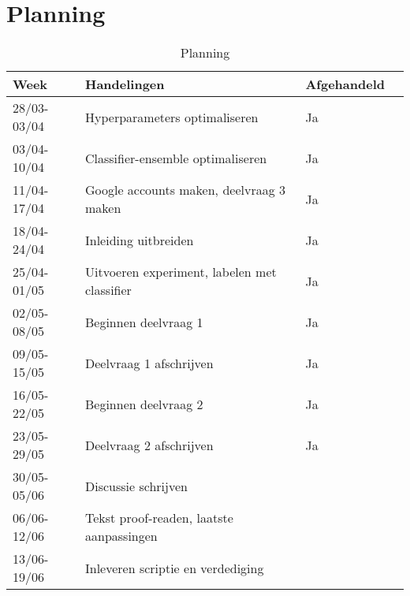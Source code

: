 \documentclass[../main.tex]{subfiles}
\begin{document}
\section{Planning}

\begin{table}[!b]
\centering
\caption{Planning}
\label{tab:planning}
\begin{tabular}{@{}ll@{}ll@{}}
\toprule
Week        & Handelingen                                                     & Afgehandeld \\ \midrule
28/03-03/04 & Hyperparameters optimaliseren                                   &     Ja      \\
03/04-10/04 & Classifier-ensemble optimaliseren                               &     Ja      \\
11/04-17/04 & Google accounts maken, deelvraag 3 maken                        &     Ja      \\
18/04-24/04 & Inleiding uitbreiden                                            &     Ja      \\
25/04-01/05 & Uitvoeren experiment, labelen met classifier                    &     Ja      \\
02/05-08/05 & Beginnen deelvraag 1                                            &     Ja      \\
09/05-15/05 & Deelvraag 1 afschrijven                                         &     Ja      \\
16/05-22/05 & Beginnen deelvraag 2                                            &     Ja      \\
23/05-29/05 & Deelvraag 2 afschrijven                                         &     Ja      \\
30/05-05/06 & Discussie schrijven                                             &             \\
06/06-12/06 & Tekst proof-readen, laatste aanpassingen                        &             \\
13/06-19/06 & Inleveren scriptie en verdediging                               &             \\ \bottomrule
\end{tabular}

\end{table}
\end{document}
